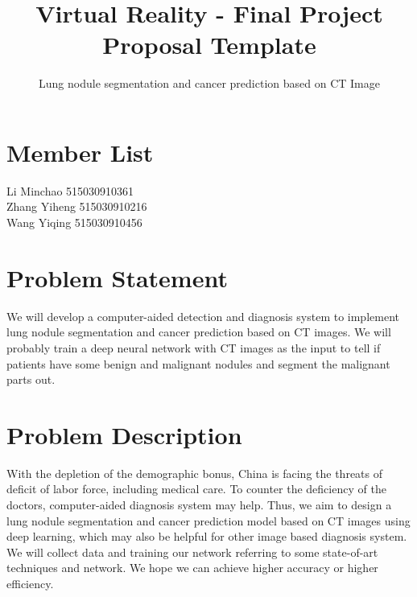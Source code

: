 \documentclass[hyperref]{article}
\theoremstyle{nonumberplain}
\begin{document}
\title{\bf Virtual Reality - Final Project Proposal Template} 
\author{\sffamily Lung nodule segmentation and cancer prediction based on CT Image\\}
\maketitle

\section{Member List}
{\noindent \large{Li Minchao \hspace{1.65cm}515030910361}\\}
{\noindent \large{\hspace{1cm} Zhang Yiheng \hspace{1.03cm} 515030910216}\\}
{\noindent \large{\hspace{1cm} Wang Yiqing  \hspace{1.2cm} 515030910456}}
\section{Problem Statement}
We will develop a computer-aided detection and diagnosis system to implement lung nodule segmentation and cancer prediction based on CT images. We will probably train a deep neural network with CT images as the input to tell if patients have some benign and malignant nodules and segment the malignant parts out.

\section{Problem Description}
With the depletion of the demographic bonus, China is facing the threats of deficit of labor force, including medical care. To counter the deficiency of the doctors, computer-aided diagnosis system may help. Thus, we aim to design a lung nodule segmentation and cancer prediction model based on CT images using deep learning, which may also be helpful for other image based diagnosis system. We will collect data and training our network referring to some state-of-art techniques and network. We hope we can achieve higher accuracy or higher efficiency.
\end{document}
